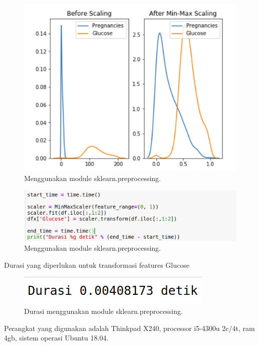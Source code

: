 \documentclass[conference]{IEEEtran}
\begin{document}
\begin{figure}[htbp]
	\includegraphics[width=\linewidth]{img/graph.png}
	\caption{Menggunakan module sklearn.preprocessing.}
\end{figure}

\begin{figure}[htbp]
	\includegraphics[width=\linewidth]{img/sklearn_preprocessing.png}
	\caption{Menggunakan module sklearn.preprocessing.}
\end{figure}

Durasi yang diperlukan untuk transformasi features Glucose

\begin{figure}[htbp]
	\includegraphics[width=\linewidth]{img/durasi_preprocessing.png}
	\caption{Durasi menggunakan module sklearn.preprocessing.}
\end{figure}

Perangkat yang digunakan adalah Thinkpad X240, processor i5-4300u 2c/4t, ram 4gb, sistem operasi Ubuntu 18.04.
\end{document}
